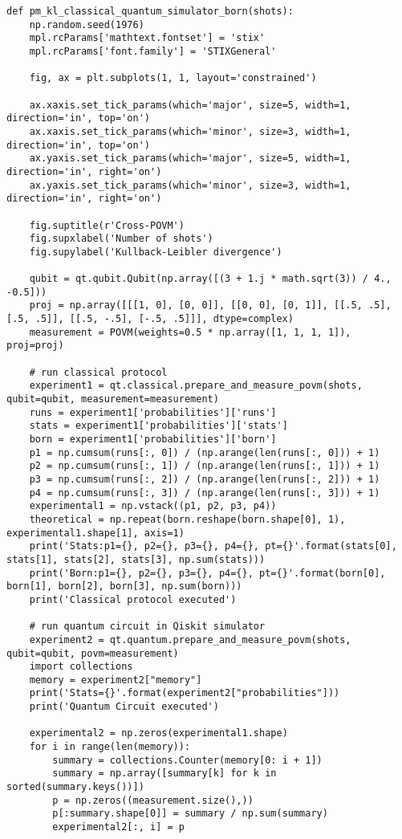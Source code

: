 \begin{verbatim}
def pm_kl_classical_quantum_simulator_born(shots):
    np.random.seed(1976)
    mpl.rcParams['mathtext.fontset'] = 'stix'
    mpl.rcParams['font.family'] = 'STIXGeneral'

    fig, ax = plt.subplots(1, 1, layout='constrained')

    ax.xaxis.set_tick_params(which='major', size=5, width=1, direction='in', top='on')
    ax.xaxis.set_tick_params(which='minor', size=3, width=1, direction='in', top='on')
    ax.yaxis.set_tick_params(which='major', size=5, width=1, direction='in', right='on')
    ax.yaxis.set_tick_params(which='minor', size=3, width=1, direction='in', right='on')

    fig.suptitle(r'Cross-POVM')
    fig.supxlabel('Number of shots')
    fig.supylabel('Kullback-Leibler divergence')

    qubit = qt.qubit.Qubit(np.array([(3 + 1.j * math.sqrt(3)) / 4., -0.5]))
    proj = np.array([[[1, 0], [0, 0]], [[0, 0], [0, 1]], [[.5, .5], [.5, .5]], [[.5, -.5], [-.5, .5]]], dtype=complex)
    measurement = POVM(weights=0.5 * np.array([1, 1, 1, 1]), proj=proj)

    # run classical protocol
    experiment1 = qt.classical.prepare_and_measure_povm(shots, qubit=qubit, measurement=measurement)
    runs = experiment1['probabilities']['runs']
    stats = experiment1['probabilities']['stats']
    born = experiment1['probabilities']['born']
    p1 = np.cumsum(runs[:, 0]) / (np.arange(len(runs[:, 0])) + 1)
    p2 = np.cumsum(runs[:, 1]) / (np.arange(len(runs[:, 1])) + 1)
    p3 = np.cumsum(runs[:, 2]) / (np.arange(len(runs[:, 2])) + 1)
    p4 = np.cumsum(runs[:, 3]) / (np.arange(len(runs[:, 3])) + 1)
    experimental1 = np.vstack((p1, p2, p3, p4))
    theoretical = np.repeat(born.reshape(born.shape[0], 1), experimental1.shape[1], axis=1)
    print('Stats:p1={}, p2={}, p3={}, p4={}, pt={}'.format(stats[0], stats[1], stats[2], stats[3], np.sum(stats)))
    print('Born:p1={}, p2={}, p3={}, p4={}, pt={}'.format(born[0], born[1], born[2], born[3], np.sum(born)))
    print('Classical protocol executed')

    # run quantum circuit in Qiskit simulator
    experiment2 = qt.quantum.prepare_and_measure_povm(shots, qubit=qubit, povm=measurement)
    import collections
    memory = experiment2["memory"]
    print('Stats={}'.format(experiment2["probabilities"]))
    print('Quantum Circuit executed')

    experimental2 = np.zeros(experimental1.shape)
    for i in range(len(memory)):
        summary = collections.Counter(memory[0: i + 1])
        summary = np.array([summary[k] for k in sorted(summary.keys())])
        p = np.zeros((measurement.size(),))
        p[:summary.shape[0]] = summary / np.sum(summary)
        experimental2[:, i] = p


\end{verbatim}
